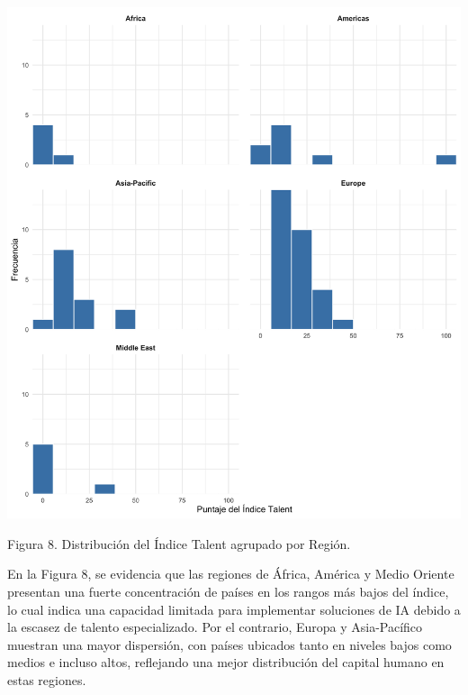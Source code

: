 \documentclass[
]{article}
\begin{document}
\begin{multicols}{2}




\begin{center}
\includegraphics[width=\linewidth]{figura8.png}
\end{center}
Figura 8. Distribución del Índice Talent agrupado por Región.

En la Figura 8, se evidencia que las regiones de África, América y Medio Oriente presentan una fuerte concentración de países en los rangos más bajos del índice, lo cual indica una capacidad limitada para implementar soluciones de IA debido a la escasez de talento especializado. Por el contrario, Europa y Asia-Pacífico muestran una mayor dispersión, con países ubicados tanto en niveles bajos como medios e incluso altos, reflejando una mejor distribución del capital humano en estas regiones.





\end{multicols}
\end{document}
